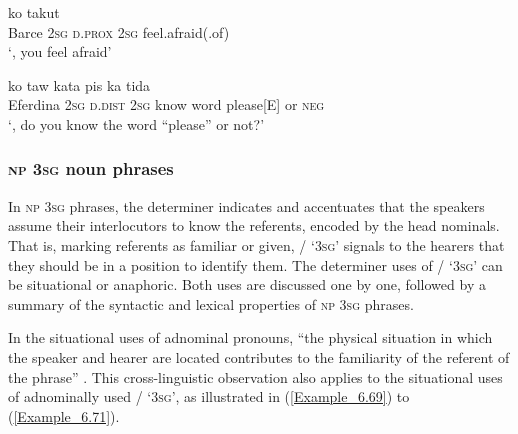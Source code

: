 \ea
\label{Example_6.67}\label{bkm:Ref353011958}
 {} {} {ko} {takut}\\ %
 Barce  \textsc{2sg}  \textsc{d.prox}  \textsc{2sg}  feel.afraid(.of)\\

\glt
‘, you feel afraid’ \textstyleExampleSource{[081109-001-Cv.0131]}
\z

\ea
\label{Example_6.68}\label{bkm:Ref353011959}
 {} {} {ko} {taw} {kata} {pis} {ka} {tida}\\ %
 Eferdina  \textsc{2sg}  \textsc{d.dist}  \textsc{2sg}  know  word  please[E]  or  \textsc{neg}\\
\glt
‘, do you know the word ``please'' or not?’ \textstyleExampleSource{[081115-001a-Cv.0145]}
\z


\subsubsection[\textsc{np} \textsc{3sg} {noun} phrases]{\textsc{np} \textsc{3sg} {noun} phrases}
\label{Para_6.2.1.2}
In \textsc{np} \textsc{3sg}  phrases, the determiner  indicates and accentuates that the speakers assume their interlocutors to know the referents, encoded by the head nominals. That is, marking referents as familiar or given, / ‘\textsc{3sg}’ signals to the hearers that they should be in a position to identify them. The determiner uses of / ‘\textsc{3sg}’ can be situational or anaphoric. Both uses are discussed one by one, followed by a summary of the syntactic and lexical properties of \textsc{np} \textsc{3sg}  phrases.

In the situational uses of adnominal pronouns, “the physical situation in which the speaker and hearer are located contributes to the familiarity of the referent of the   phrase” \citep[4]{Lyons.1999}. This cross-linguistic observation also applies to the situational uses of adnominally used / ‘\textsc{3sg}’, as illustrated in (\ref{Example_6.69}) to (\ref{Example_6.71}).



